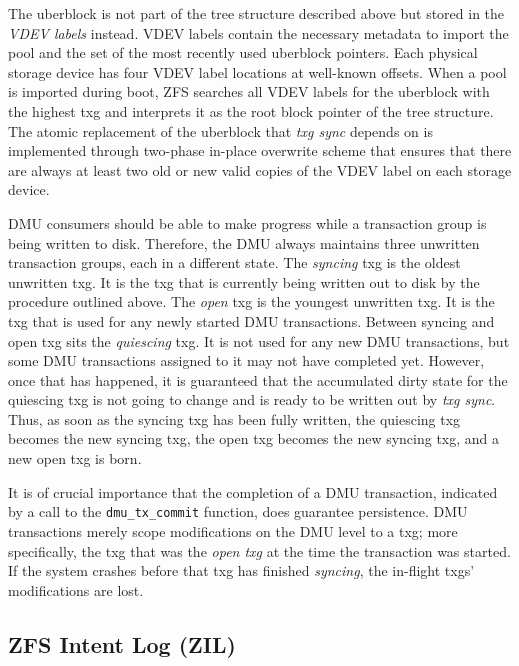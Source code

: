 \documentclass[12pt,a4paper,twoside]{book}
\begin{document}
The uberblock is not part of the tree structure described above but stored in the \textit{VDEV labels} instead.
VDEV labels contain the necessary metadata to import the pool and the set of the most recently used uberblock pointers.
Each physical storage device has four VDEV label locations at well-known offsets.
When a pool is imported during boot, ZFS searches all VDEV labels for the uberblock with the highest txg and interprets it as the root block pointer of the tree structure.
The atomic replacement of the uberblock that \textit{txg sync} depends on is implemented through two-phase in-place overwrite scheme that ensures that there are always at least two old or new valid copies of the VDEV label on each storage device.

DMU consumers should be able to make progress while a transaction group is being written to disk.
Therefore, the DMU always maintains three unwritten transaction groups, each in a different state.
The \textit{syncing} txg is the oldest unwritten txg.
It is the txg that is currently being written out to disk by the procedure outlined above.
The \textit{open} txg is the youngest unwritten txg.
It is the txg that is used for any newly started DMU transactions.
Between syncing and open txg sits the \textit{quiescing} txg.
It is not used for any new DMU transactions, but some DMU transactions assigned to it may not have completed yet.
However, once that has happened, it is guaranteed that the accumulated dirty state for the quiescing txg is not going to change and is ready to be written out by \textit{txg sync}.
Thus, as soon as the syncing txg has been fully written, the quiescing txg becomes the new syncing txg, the open txg becomes the new syncing txg, and a new open txg is born.

It is of crucial importance that the completion of a DMU transaction, indicated by a call to the \lstinline{dmu_tx_commit} function, does \underline{} guarantee persistence.
DMU transactions merely scope modifications on the DMU level to a txg; more specifically, the txg that was the \textit{open txg} at the time the transaction was started.
If the system crashes before that txg has finished \textit{syncing}, the in-flight txgs' modifications are lost.

\clearpage %

\subsection{ZFS Intent Log (ZIL)}\label{openzfs:the_zil_api}
\end{document}
